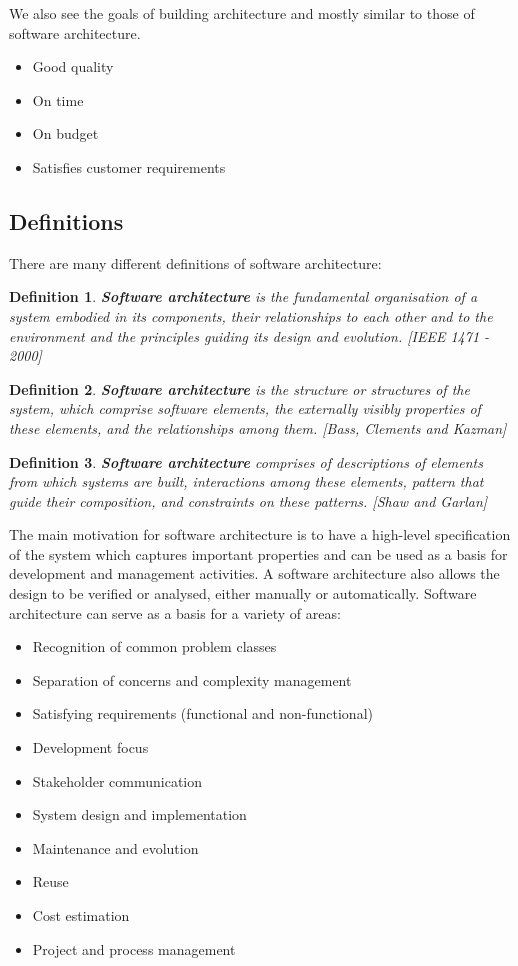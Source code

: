 \documentclass{sty/SizheArticle}
\newtheorem{definition}{Definition}
\begin{document}
We also see the goals of building architecture and mostly similar to those of
software architecture.
\begin{itemize}
\item Good quality
\item On time
\item On budget
\item Satisfies customer requirements
\end{itemize}

\subsection{Definitions}
There are many different definitions of software architecture:

\begin{definition}
\textbf{Software architecture} is the fundamental organisation of a system 
embodied in its components, their relationships to each other and 
to the environment and the principles guiding its design and evolution. 
[IEEE 1471 - 2000]
\end{definition}

\begin{definition}
\textbf{Software architecture} is the structure or structures of the system,
which comprise software elements, the externally visibly properties of
these elements, and the relationships among them. [Bass, Clements and Kazman]
\end{definition}

\begin{definition}
\textbf{Software architecture} comprises of descriptions of elements from which
systems are built, interactions among these elements, pattern that guide their
composition, and constraints on these patterns. [Shaw and Garlan]
\end{definition}

The main motivation for software architecture is to have a high-level
specification of the system which captures important properties and can be
used as a basis for development and management activities.  A software 
architecture also allows the design to be verified or analysed, either
manually or automatically. Software architecture can serve as a basis for
a variety of areas:
\begin{itemize}
\item Recognition of common problem classes
\item Separation of concerns and complexity management
\item Satisfying requirements (functional and non-functional)
\item Development focus
\item Stakeholder communication
\item System design and implementation
\item Maintenance and evolution
\item Reuse
\item Cost estimation
\item Project and process management
\end{itemize}
\end{document}
